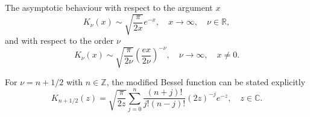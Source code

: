 \documentclass[10pt,a4paper,oneside]{article}
\numberwithin{equation}{section}
\begin{document}
The asymptotic behaviour with respect to the argument $x$
\begin{equation}\label{besselk_x_to_inf}
K_{\nu}(x) \sim \sqrt{\frac{\pi}{2x}} e^{-x}, \quad x \to \infty, \quad \nu \in \mathbb{R},
\end{equation}
and with respect to the order $\nu$
\begin{equation}\label{besselk_order_to_inf}
K_{\nu}(x) \sim \sqrt{\frac{\pi}{2\nu}}\left(\frac{ex}{2\nu}\right)^{-\nu}, \quad \nu \to \infty, \quad x \neq 0.
\end{equation}

For $\nu = n + 1/2$ with $n \in \mathbb{Z}$, the modified Bessel function can be stated explicitly
\begin{equation}\label{besselk_half}
K_{n + 1/2}(z) = \sqrt{\frac{\pi}{2z}} \sum_{j=0}^n \frac{(n + j)!}{j! (n-j)!} (2z)^{-j}e^{-z}, \quad z\in \mathbb{C}.
\end{equation}

%
%
%
%
%
%
%



\end{document}
